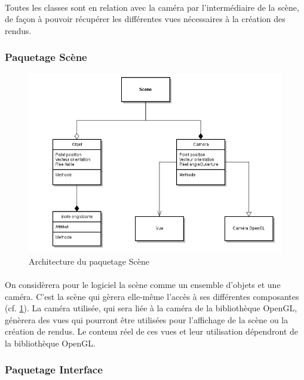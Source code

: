 \paragraph{}
Toutes les classes sont en relation avec la caméra par l’intermédiaire de la scène, de façon à pouvoir récupérer les différentes vues nécessaires à la création des rendus.

\newpage

\subsubsection{Paquetage Scène}

\begin{figure}[h]
		\centering
		\includegraphics[scale=0.4]{paquetage_scene.jpg}
		\caption{\label{fig:paqScene} Architecture du paquetage Scène}
\end{figure}

\paragraph{}
On considèrera pour le logiciel la scène comme un ensemble d’objets et une caméra. C’est la scène qui gèrera elle-même l’accès à ses différentes composantes (cf. \ref{fig:paqScene}). La caméra utilisée, qui sera liée à la caméra de la bibliothèque OpenGL, génèrera des vues qui pourront être utilisées pour l’affichage de la scène ou la création de rendus. Le contenu réel de ces vues et leur utilisation dépendront de la bibliothèque OpenGL.

\newpage

\subsubsection{Paquetage Interface}

